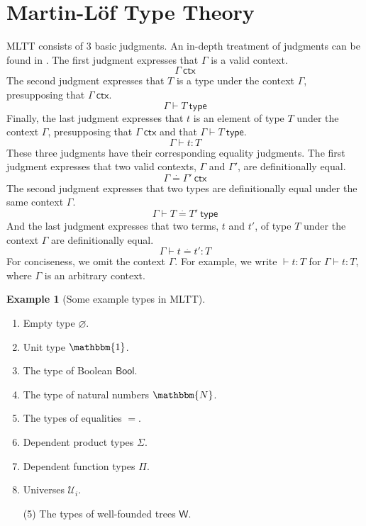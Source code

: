 \documentclass{amsart}
\theoremstyle{definition}
\newtheorem{eg}{Example}[section]
\newcommand{\N}{\mathbbm{N}}
\newcommand{\ctx}{\ensuremath{\mathsf{~ctx}}}
\newcommand{\type}{\ensuremath{\mathsf{~type}}}
\newcommand{\defeq}{\ensuremath{\overset{\boldsymbol{\cdot}}{=}}}
\newcommand{\Unit}{\ensuremath{\mathbbm{1}}}
\newcommand{\Bool}{\ensuremath{\mathsf{Bool}}}
\newcommand{\W}{\ensuremath{\mathsf{W}}}
\newcommand{\U}{\ensuremath{\mathcal{U}}}
\begin{document}
\section{Martin-L\"{o}f Type Theory}
\label{sec:martin-lof-type-theory}
MLTT consists of 3 basic judgments.
An in-depth treatment of judgments can be found in \cite{ml:justif-log}.
The first judgment expresses that $\Gamma$ is a valid context.
\[
\Gamma \ctx
\]
The second judgment expresses that $T$ is a type under the context $\Gamma$, presupposing that $\Gamma \ctx$.
\[
\Gamma \vdash T \type
\]
Finally, the last judgment expresses that $t$ is an element of type $T$ under the context $\Gamma$, presupposing that $\Gamma \ctx$ and that $\Gamma \vdash T \type$.
\[
\Gamma \vdash t : T
\]
These three judgments have their corresponding equality judgments.
The first judgment expresses that two valid contexts, $\Gamma$ and $\Gamma'$, are definitionally equal.
\[
\Gamma \defeq \Gamma' \ctx
\]
The second judgment expresses that two types are definitionally equal under the same context $\Gamma$.
\[
\Gamma \vdash T \defeq T' \type
\]
And the last judgment expresses that two terms, $t$ and $t'$, of type $T$ under the context $\Gamma$ are definitionally equal.
\[
\Gamma \vdash t \defeq t' : T
\]
For conciseness, we omit the context $\Gamma$.
For example, we write $\vdash t : T$ for $\Gamma \vdash t : T$, where $\Gamma$ is an arbitrary context.
\begin{eg}[Some example types in MLTT]
\hfill
\begin{multicols}{2}
\begin{enumerate}
\item Empty type $\varnothing$.
\item Unit type $\Unit$.
\item The type of Boolean $\Bool$.
\item The type of natural numbers $\N$.
\item The types of equalities $=$.
\item Dependent product types $\Sigma$.
\item Dependent function types $\Pi$.
\item Universes $\U_{i}$.
\end{enumerate}
\end{multicols}
\vspace{-\baselineskip}
\begin{enumerate}
    \item[(5)] The types of well-founded trees $\W$. 
\end{enumerate}
\end{eg}
\end{document}
